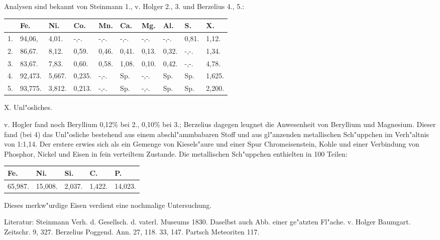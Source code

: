 \documentclass[a4paper, 11pt, oneside]{article}
\begin{document}
Analysen sind bekannt von Steinmann 1., v. Holger 2., 3. und Berzelius 4., 5.:
\begin{table}[H]
    \centering\swabfamily\Large
    \begin{tabular}{l l l l l l l l l l}
         & Fe. & Ni. & Co. & Mn. & Ca. & Mg. & Al. & S. & X. \\ \hline
        1. & 94,06, & 4,01. & -,-. & -,-. & -,-. & -,-. & -,-. & 0,81. & 1,12. \\
        2. & 86,67. & 8,12. & 0,59. & 0,46. & 0,41. & 0,13. & 0,32. & -,-. & 1,34. \\
        3. & 83,67. & 7,83. & 0,60. & 0,58. & 1,08. & 0,10. & 0,42. & -,-. & 4,78. \\
        4. & 92,473. & 5,667. & 0,235. & -,-. & Sp. & -,-. & Sp. & Sp. & 1,625. \\
        5. & 93,775. & 3,812. & 0,213. & -,-. & Sp. & -,-. & Sp. & Sp. & 2,200. \\
    \end{tabular}
\end{table}

X. Unl"osliches.

v. Hogler fand noch Beryllium 0,12\% bei 2., 0,10\% bei 3.; Berzelius dagegen leugnet die Anwesenheit von Beryllium und Magnesium. Dieser fand (bei 4) das Unl"osliche bestehend aus einem abschl"ammbabaren Stoff und aus gl"anzenden metallischen Sch"uppchen im Verh"altnis von 1:1,14. Der erstere erwies sich als ein Gemenge von Kiesels"aure und einer Spur Chromeisenstein, Kohle und einer Verbindung von Phosphor, Nickel und Eisen in fein verteiltem Zustande. Die metallischen Sch"uppchen enthielten in 100 Teilen:
\begin{table}[H]
    \centering\swabfamily\Large
    \begin{tabular}{l l l l l}
        Fe. & Ni. & Si. & C. & P. \\ \hline
        65,987. & 15,008. & 2,037. & 1,422. & 14,023. \\
    \end{tabular}
\end{table}

Dieses merkw"urdige Eisen verdient eine nochmalige Untersuchung.

\normalsize
Literatur: Steinmann Verh. d. Gesellsch. d. vaterl. Museums 1830. Daselbst auch Abb. einer ge"atzten Fl"ache. v. Holger Baumgart. Zeitschr. 9, 327. Berzelius Poggend. Ann. 27, 118. 33, 147. Partsch Meteoriten 117.

\subsection{}
\LARGE
\end{document}
